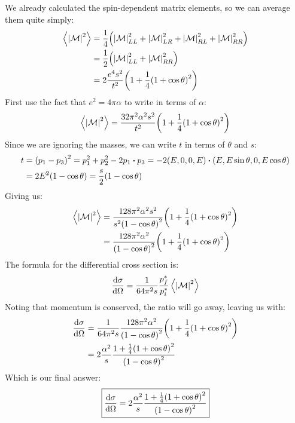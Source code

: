 \documentclass[12pt]{article}
\newcommand{\M}{\mathcal{M}}
\begin{document}
We already calculated the spin-dependent matrix elements, so we can average them quite simply:
\begin{align*}
  \ev{\abs{\M}^2}&=\frac14
  \qty(\abs{\M}_{LL}^2+\abs{\M}_{LR}^2+\abs{\M}_{RL}^2+\abs{\M}_{RR}^2)\\
  &=\frac12\qty(\abs{\M}_{LL}^2+\abs{\M}_{RR}^2)\\
  &=2\frac{e^4s^2}{t^2}\qty(1+\frac14{(1+\cos\theta)}^2)
\end{align*}
First use the fact that $e^2=4\pi\alpha$ to write in terms of $\alpha$:
\begin{align*}
  \ev{\abs{\M}^2}=\frac{32\pi^2\alpha^2s^2}{t^2}
  \qty(1+\frac14{(1+\cos\theta)}^2)
\end{align*}
Since we are ignoring the masses, we can write $t$ in terms of $\theta$ and $s$:
\begin{align*}
  t&={(p_1-p_3)}^2=p_1^2+p_2^2-2p_1\vdot p_3
  =-2(E,0,0,E)\vdot(E,E\sin\theta,0,E\cos\theta)\\
  &=2E^2(1-\cos\theta)=\frac{s}2(1-\cos\theta)
\end{align*}
Giving us:
\begin{align*}
  \ev{\abs{\M}^2}&=\frac{128\pi^2\alpha^2s^2}{s^2{(1-\cos\theta)}^2}
  \qty(1+\frac14{(1+\cos\theta)}^2)\\
  &=\frac{128\pi^2\alpha^2}{{(1-\cos\theta)}^2}
  \qty(1+\frac14{(1+\cos\theta)}^2)
\end{align*}
The formula for the differential cross section is:
\begin{align*}
  \dv{\sigma}{\Omega}=\frac{1}{64\pi^2s}\frac{p_f^*}{p_i^*}\ev{\abs{\M}^2}
\end{align*}
Noting that momentum is conserved, the ratio will go away, leaving us with:
\begin{align*}
  \dv{\sigma}{\Omega}&=\frac{1}{64\pi^2s}
  \frac{128\pi^2\alpha^2}{{(1-\cos\theta)}^2}
  \qty(1+\frac14{(1+\cos\theta)}^2)\\
  &=2\frac{\alpha^2}{s}
  \frac{1+\frac14{(1+\cos\theta)}^2}{{(1-\cos\theta)}^2}
\end{align*}
Which is our final answer:
\begin{equation}
  \label{eq:p3e}
  \boxed{\dv{\sigma}{\Omega}=2\frac{\alpha^2}{s}
  \frac{1+\frac14{(1+\cos\theta)}^2}{{(1-\cos\theta)}^2}}
\end{equation}
\newpage
\end{document}
